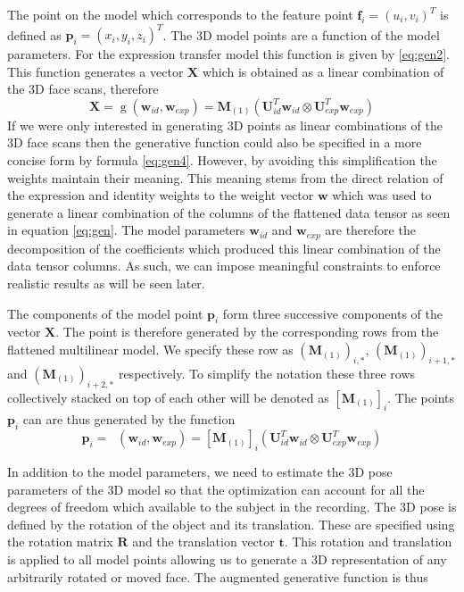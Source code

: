 \documentclass[11pt,a4paper]{report}
\begin{document}
The point on the model
which corresponds to the feature point $\mathbf{f}_i = (u_i,v_i)^T$ is defined as $\mathbf{p}_i = (x_i,y_i,z_i)^T$. The 3D model
points are a function of the model parameters. For the expression transfer model
this function is given by \ref{eq:gen2}. This function generates a vector
$\mathbf{X}$ which is 
obtained as a linear combination of the 3D face scans, therefore 
\begin{equation}\label{eq:fit1}
\mathbf{X} = \mathop{g}(\mathbf{w}_{id},\mathbf{w}_{exp})= \mathbf{M}_{(1)}(\mathbf{U}_{id}^T\mathbf{w}_{id} \otimes
\mathbf{U}_{exp}^T\mathbf{w}_{exp})
\end{equation}
If we were only interested in
generating 3D points as linear combinations of the 3D face scans 
then the generative function could also be specified in a more concise form by
formula \ref{eq:gen4}. However, by avoiding this simplification the weights
maintain their meaning. This meaning stems from the direct relation of the
expression and identity weights to the weight vector $\mathbf{w}$ which was used
to generate a linear combination of the columns of the flattened data
tensor as seen in equation \ref{eq:gen}. The model parameters $\mathbf{w}_{id}$
and $\mathbf{w}_{exp}$ are therefore the decomposition of the coefficients which produced this
linear combination of the data tensor columns. As such, we can impose meaningful
constraints to enforce realistic results as will be seen later. 

The components of the model point $\mathbf{p}_i$ form three successive components of the vector
$\mathbf{X}$. The point is therefore
generated by the corresponding rows from the flattened multilinear
model. We specify these row as $(\mathbf{M}_{(1)})_{i,*}$,
$(\mathbf{M}_{(1)})_{i+1,*}$ and $(\mathbf{M}_{(1)})_{i+2,*}$ respectively. To
simplify the notation these three rows collectively stacked on top of each other
will be denoted as
$[\mathbf{M}_{(1)}]_{i}$. The points $\mathbf{p}_i$ can are thus generated by the function
\begin{equation}\label{eq:fit2}
\mathbf{p}_i = \mathop{g_i}(\mathbf{w}_{id},\mathbf{w}_{exp})
= [\mathbf{M}_{(1)}]_{i}(\mathbf{U}_{id}^T\mathbf{w}_{id} \otimes \mathbf{U}_{exp}^T\mathbf{w}_{exp})
\end{equation}

In addition to the model parameters, we need
to estimate the 3D pose parameters of the 3D model so that the optimization can
account for all the degrees of freedom which available to the subject in the recording. The 3D
pose is defined by the rotation of the object and its translation. These are
specified using the rotation matrix $\mathbf{R}$ and the translation vector
$\mathbf{t}$. This rotation and translation is applied to all model points
allowing us to generate a 3D representation of any arbitrarily rotated or
 moved face. The augmented generative function is thus
\end{document}
